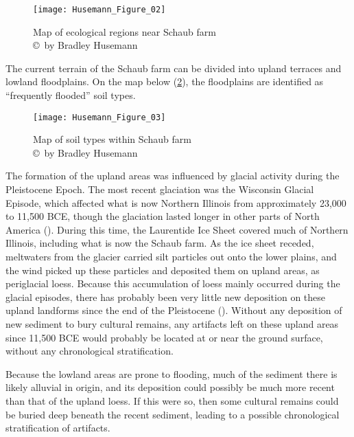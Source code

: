 \begin{figure}[!htb]
	\texttt{[image: Husemann\_Figure\_02]}
	\caption{Map of ecological regions near Schaub farm
		{\normalfont\scriptsize \\ \copyright\ by Bradley Husemann
	}}
	\label{fig:Husemann_Figure_02}
\end{figure}

The current terrain of the Schaub farm can be divided into upland terraces and lowland floodplains. On the map below (\cref{fig:Husemann_Figure_03}), the floodplains are identified as “frequently flooded” soil types.

\begin{figure}[!htb]
	\texttt{[image: Husemann\_Figure\_03]}
	\caption{Map of soil types within Schaub farm
		{\normalfont\scriptsize \\ \copyright\ by Bradley Husemann
	}}
	\label{fig:Husemann_Figure_03}
\end{figure}

The formation of the upland areas was influenced by glacial activity during the Pleistocene Epoch. The most recent glaciation was the Wisconsin Glacial Episode, which affected what is now Northern Illinois from approximately 23,000 to 11,500 BCE, though the glaciation lasted longer in other parts of North America (\cite{ehlers2004}). During this time, the Laurentide Ice Sheet covered much of Northern Illinois, including what is now the Schaub farm. As the ice sheet receded, meltwaters from the glacier carried silt particles out onto the lower plains, and the wind picked up these particles and deposited them on upland areas, as periglacial loess. Because this accumulation of loess mainly occurred during the glacial episodes, there has probably been very little new deposition on these upland landforms since the end of the Pleistocene (\cite{carroll1970}). Without any deposition of new sediment to bury cultural remains, any artifacts left on these upland areas since 11,500 BCE would probably be located at or near the ground surface, without any chronological stratification.

Because the lowland areas are prone to flooding, much of the sediment there is likely alluvial in origin, and its deposition could possibly be much more recent than that of the upland loess. If this were so, then some cultural remains could be buried deep beneath the recent sediment, leading to a possible chronological stratification of artifacts.

